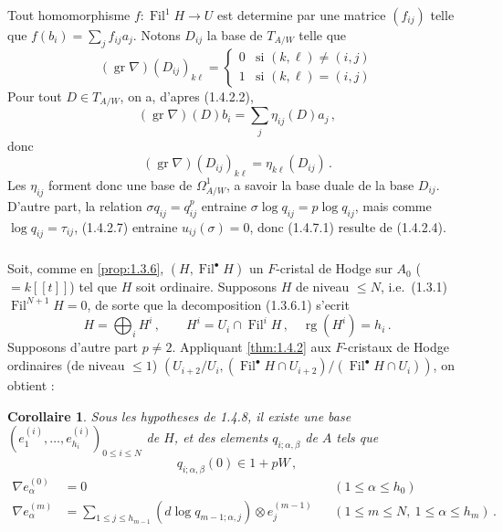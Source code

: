 \documentclass[12pt,a4paper]{article}
\theoremstyle{plain}
\newtheorem{corollary}[theorem]{Corollaire}
\theoremstyle{definition}
\theoremstyle{remark}
\DeclareMathOperator{\gr}{gr}
\DeclareMathOperator{\Fil}{Fil}
\DeclareMathOperator{\rg}{rg}
\begin{document}
Tout homomorphisme $f : \Fil^1H \to U$ est determine par une matrice $(f_{ij})$ telle que $f(b_i) = \sum_j f_{ij}a_j$. Notons $D_{ij}$ la base de $T_{A/W}$ telle que
\[
(\gr\nabla)(D_{ij})_{k\ell} = \begin{cases} 0 & \text{si } (k,\ell) \neq (i,j)\\ 1 & \text{si } (k,\ell) = (i,j)\end{cases}
\]
Pour tout $D \in T_{A/W}$, on a, d'apres (1.4.2.2),
\[
(\gr\nabla)(D)b_i = \sum_j \eta_{ij}(D)a_j\,,
\]
donc
\[
(\gr\nabla)(D_{ij})_{k\ell} = \eta_{k\ell}(D_{ij})\,.\]
Les $\eta_{ij}$ forment donc une base de $\Omega^1_{A/W}$, a savoir la base duale de la base $D_{ij}$. D'autre part, la relation $\sigma q_{ij} = q_{ij}^p$ entraine $\sigma\log q_{ij} = p\log q_{ij}$, mais comme $\log q_{ij} = \tau_{ij}$, (1.4.2.7) entraine $u_{ij}(\sigma) = 0$, donc (1.4.7.1) resulte de (1.4.2.4).

\subsubsection{}

Soit, comme en \ref{prop:1.3.6}, $(H, \Fil^\bullet H)$ un $F$-cristal de Hodge sur $A_0$ ($= k[[t]]$) tel que $H$ soit ordinaire. Supposons $H$ de niveau $\leq N$, i.e.\ (1.3.1) $\Fil^{N+1}H = 0$, de sorte que la decomposition (1.3.6.1) s'ecrit
\begin{equation}\label{eq:1.4.8.1}
H = \bigoplus_i H^i\,, \qquad H^i = U_i \cap \Fil^iH\,, \quad \rg(H^i) = h_i\,.\end{equation}
Supposons d'autre part $p \neq 2$. Appliquant \ref{thm:1.4.2} aux $F$-cristaux de Hodge ordinaires (de niveau $\leq 1$) $(U_{i+2}/U_i, (\Fil^\bullet H \cap U_{i+2})/(\Fil^\bullet H \cap U_i))$, on obtient :

\begin{corollary}\label{cor:1.4.9}
Sous les hypotheses de \emph{1.4.8}, il existe une base $(e_1^{(i)}, \ldots, e_{h_i}^{(i)})_{0 \leq i \leq N}$ de $H$, et des elements $q_{i;\alpha,\beta}$ de $A$ tels que
\[
q_{i;\alpha,\beta}(0) \in 1 + pW\,,
\]
\begin{equation}\label{eq:1.4.9.1}
\begin{aligned}
\nabla e_\alpha^{(0)} &= 0 && (1 \leq \alpha \leq h_0)\\
\nabla e_\alpha^{(m)} &= \sum_{1 \leq j \leq h_{m-1}} (d\log q_{m-1;\alpha,j}) \otimes e_j^{(m-1)} && (1 \leq m \leq N,\ 1 \leq \alpha \leq h_m)\,.\end{aligned}
\end{equation}
\end{corollary}
\end{document}
